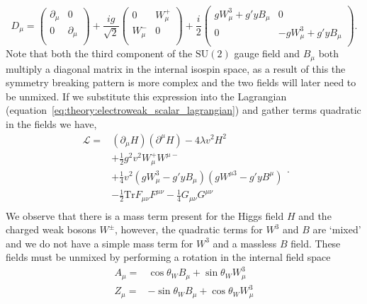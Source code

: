 \begin{equation}
    \label{eq:theory:explicit_covderiv_ew}
    D_{\mu} = 
    \begin{pmatrix}
        \partial_{\mu} & 0 \\
        0 & \partial_{\mu} \\
    \end{pmatrix} + 
    \frac{ig}{\sqrt{2}}
    \begin{pmatrix}
        0 & W_{\mu}^{+} \\
        W_{\mu}^{-} & 0  \\
    \end{pmatrix} +
    \frac{i}{2}
    \begin{pmatrix}
        gW_{\mu}^{3} + g'yB_{\mu} & 0 \\
        0 & -gW_{\mu}^{3} + g'yB_{\mu} \\
    \end{pmatrix}.
\end{equation}
Note that both the third component of the $\mathrm{SU}(2)$ gauge field and $B_{\mu}$ both multiply a diagonal matrix in the internal isospin space, as a result of this the symmetry breaking pattern is more complex and the two fields will later need to be unmixed. 
If we substitute this expression into the Lagrangian (equation~\ref{eq:theory:electroweak_scalar_lagrangian}) and gather terms quadratic in the fields we have,
\begin{equation}
    \label{eq:theory:electroweak_scalar_quad}
    \begin{split}
    \mathcal{L} =& (\partial_{\mu}H)(\partial^{\mu}H) - 4\lambda{v}^{2}H^{2} \\
                 &+ \frac{1}{2}g^{2}v^{2}W_{\mu}^{+}W^{\mu -} \\
                 &+ \frac{1}{4}v^{2}(gW_{\mu}^{3} - g'yB_{\mu})(gW^{\mu 3} - g'yB^{\mu}) \\
                 &- \frac{1}{2}\mathrm{Tr}F_{\mu\nu}F^{\mu\nu} - \frac{1}{4}G_{\mu\nu}G^{\mu\nu} \\
    \end{split}.
\end{equation}
We observe that there is a mass term present for the Higgs field $H$ and the charged weak bosons $W^{\pm}$, however, the quadratic terms for $W^{3}$ and $B$ are `mixed' and we do not have a simple mass term for $W^{3}$ and a massless $B$ field. These fields must be unmixed by performing a rotation in the internal field space 
\begin{equation}
    \begin{split}
    A_{\mu} =& \cos{\theta_{W}}B_{\mu} + \sin{\theta_{W}}W_{\mu}^{3} \\
    Z_{\mu} =& -\sin{\theta_{W}}B_{\mu} + \cos{\theta_{W}}W_{\mu}^{3} \\
    \end{split}
    \label{eq:theory:mass_diag_fields}
\end{equation}
